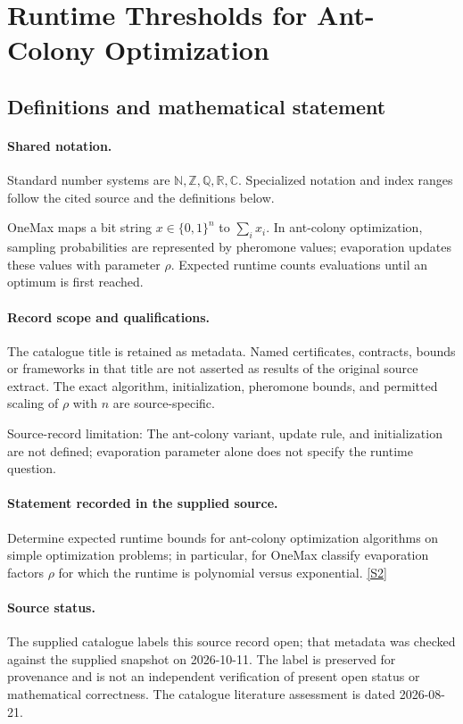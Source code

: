 \documentclass[11pt]{article}
\newcommand{\sref}[2]{\hyperlink{source:#1:#2}{[S#2]}}
\begin{document}
\section{Runtime Thresholds for Ant-Colony Optimization}\label{statement}

\subsection{Definitions and mathematical statement}

\paragraph{Shared notation.}Standard number systems are $\mathbb N,\mathbb Z,\mathbb Q,\mathbb R,\mathbb C$. Specialized notation and index ranges follow the cited source and the definitions below.


OneMax maps a bit string $x\in\{0,1\}^n$ to $\sum_i x_i$. In ant-colony optimization, sampling probabilities are represented by pheromone values; evaporation updates these values with parameter $\rho$. Expected runtime counts evaluations until an optimum is first reached.
\paragraph{Record scope and qualifications.}
The catalogue title is retained as metadata. Named certificates, contracts, bounds or frameworks in that title are not asserted as results of the original source extract.
The exact algorithm, initialization, pheromone bounds, and permitted scaling of $\rho$ with $n$ are source-specific.

Source-record limitation: The ant-colony variant, update rule, and initialization are not defined; evaporation parameter alone does not specify the runtime question.
\paragraph{Statement recorded in the supplied source.}
Determine expected runtime bounds for ant-colony optimization algorithms on simple optimization problems; in particular, for OneMax classify evaporation factors $\rho$ for which the runtime is polynomial versus exponential. \sref{statement}{2}
\paragraph{Source status.}
The supplied catalogue labels this source record open; that metadata was checked against the supplied snapshot on 2026-10-11. The label is preserved for provenance and is not an independent verification of present open status or mathematical correctness. The catalogue literature assessment is dated 2026-08-21.
\end{document}
